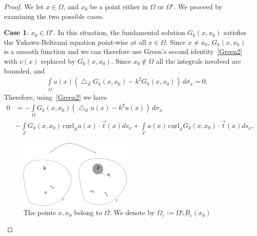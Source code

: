 \documentclass[final]{siamltex}
\newcommand{\lap}{\bigtriangleup}
\renewcommand{\S} {\mathcal{S}}
\begin{document}
\begin{proof} We let $x\in \Omega$, and $x_0$ be a point either in $\Omega$ or $\Omega^c$. 
We proceed by examining the two possible cases.

{\bf Case 1}:  $x_{0} \in \Omega^{c}$.  In this situation, the
fundamental solution $G_{k}(x,x_{0})$ satisfies the Yukawa-Beltrami
equation point-wise at all $x\in \Omega$. Since $x \neq x_0$,
$G_{k}(x,x_0)$ is a smooth function and we can therefore use Green's
second identity~\eqref{Green2} with $v(x)$ replaced by
$G_{k}(x,x_{0})$. Since $x_0\not \in \Omega$ all the
integrals involved are bounded, and 
\begin{align*}
  \int\limits_{\Omega} u(x)(\lap_{\S}G_{k}(x,x_0) 
      -k^{2}G_{k}(x,x_0)) \, d\sigma_x=0.
\end{align*}
Therefore, using~\eqref{Green2} we have 
\begin{align*}
 0 &= - \int\limits_{\Omega}
    G_k(x,x_{0})\left(\lap_{\S}u(x) -k^2 u(x)\right)\,d\sigma_x \\
    &-\int\limits_{{\Gamma}} G_k(x,x_{0}) \, \underline{\mbox{curl}}_{\S}
    u(x) \cdot \vec{t}(x) ds_{x} 
 + \int\limits_{{\Gamma}}  u(x)
 \,\underline{\mbox{curl}}_{{\S}} G_k(x,x_0) \cdot \vec{t}(x) ds_{x}.
\end{align*}
\begin{figure}
  \centering
  \includegraphics[width=0.5\textwidth]{proof1}
  \caption{\label{f:proof1} The points $x,x_0$ belong to $\Omega$. We
  denote by $\Omega_\varepsilon:=\Omega\setminus B_{\varepsilon}(x_0)$}
\end{figure}


\end{proof}
\end{document}

